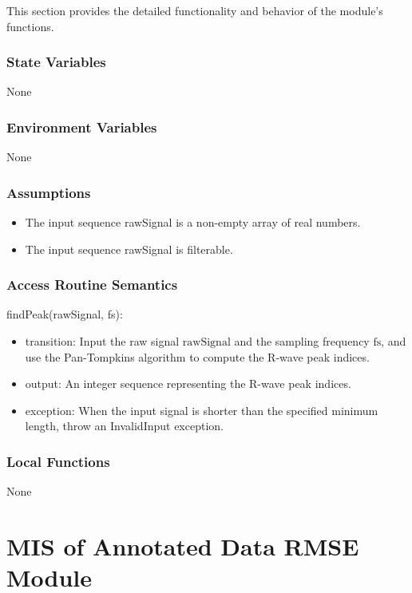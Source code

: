 \documentclass[12pt, titlepage]{article}
\begin{document}
This section provides the detailed functionality and behavior of the module’s
functions.

\subsubsection{State Variables}

None

\subsubsection{Environment Variables}

None

\subsubsection{Assumptions}

\begin{itemize}
\item The input sequence rawSignal is a non-empty array of real numbers.
\item The input sequence rawSignal is filterable.
\end{itemize}

\subsubsection{Access Routine Semantics}

\noindent findPeak(rawSignal, fs):
\begin{itemize}
\item transition: Input the raw signal $\text{rawSignal}$ and the sampling
frequency $\text{fs}$, and use the Pan-Tompkins algorithm to compute the R-wave
peak indices.
\item output: An integer sequence representing the R-wave peak indices.
\item exception: When the input signal is shorter than the specified minimum
length, throw an InvalidInput exception.
\end{itemize}

\subsubsection{Local Functions}

None

\newpage

\section{MIS of Annotated Data RMSE Module} \label{MIS_RMSE}
\end{document}
